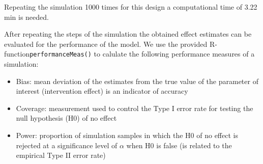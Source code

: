 \documentclass{article}\usepackage[]{graphicx}\usepackage[]{color}
\newcommand{\Rfunction}[1]{{\texttt{#1}}}
\begin{document}
 



Repeating the simulation 1000 times for this design a computational time of 3.22  min is needed.

After repeating the steps of the simulation the obtained effect estimates can be evaluated for the performance of the model.
We use the provided R-function\Rfunction{performanceMeas()} to calulate the following performance measures of a simulation:

\begin{itemize}
\item Bias: mean deviation of the estimates from the true value of the parameter of interest (intervention effect) is an indicator of accuracy
\item Coverage: measurement used to control the Type I error rate for testing the null hypothesis (H0) of no effect
\item Power: proportion of simulation samples in which the H0 of no effect is rejected at a significance level of $\alpha$ when H0 is false (is related to the empirical Type II error rate)
\end{itemize}
\end{document}
